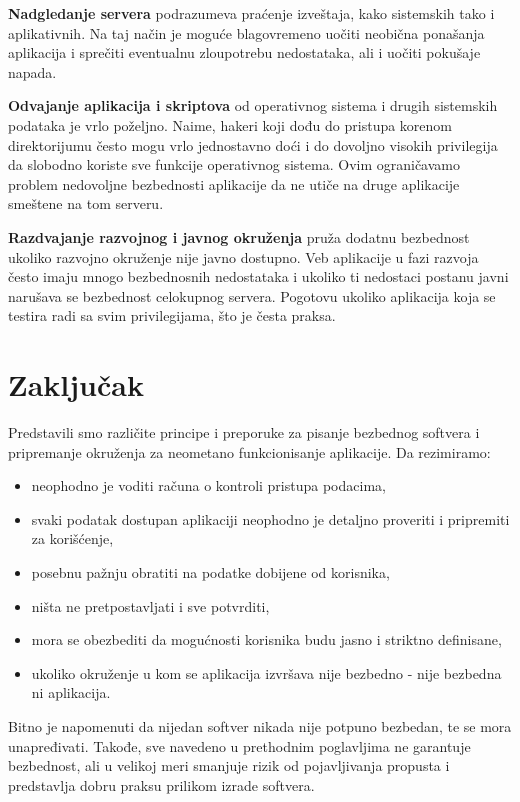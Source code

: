 \documentclass[a4paper]{article}
\begin{document}
\textbf{Nadgledanje servera} podrazumeva praćenje izveštaja, kako sistemskih tako i aplikativnih. Na taj način je moguće blagovremeno uočiti neobična ponašanja aplikacija i sprečiti eventualnu zloupotrebu nedostataka, ali i uočiti pokušaje napada.

\textbf{Odvajanje aplikacija i skriptova} od operativnog sistema i drugih sistemskih podataka je vrlo poželjno. Naime, hakeri koji dođu do pristupa korenom direktorijumu često mogu vrlo jednostavno doći i do dovoljno visokih privilegija da slobodno koriste sve funkcije operativnog sistema. Ovim ograničavamo problem nedovoljne bezbednosti aplikacije da ne utiče na druge aplikacije smeštene na tom serveru.

\textbf{Razdvajanje razvojnog i javnog okruženja} pruža dodatnu bezbednost ukoliko razvojno okruženje nije javno dostupno. Veb aplikacije u fazi razvoja često imaju mnogo bezbednosnih nedostataka i ukoliko ti nedostaci postanu javni narušava se bezbednost celokupnog servera. Pogotovu ukoliko aplikacija koja se testira radi sa svim privilegijama, što je česta praksa.

\section{Zaključak} \label{zakljucak}

Predstavili smo različite principe i preporuke za pisanje bezbednog softvera i pripremanje okruženja za neometano funkcionisanje aplikacije. Da rezimiramo:
\begin{itemize}
	\item neophodno je voditi računa o kontroli pristupa podacima,
	\item svaki podatak dostupan aplikaciji neophodno je detaljno proveriti i pripremiti za korišćenje,
	\item posebnu pažnju obratiti na podatke dobijene od korisnika,
	\item ništa ne pretpostavljati i sve potvrditi,
	\item mora se obezbediti da mogućnosti korisnika budu jasno i striktno definisane,
	\item ukoliko okruženje u kom se aplikacija izvršava nije bezbedno - nije bezbedna ni aplikacija.
\end{itemize}

Bitno je napomenuti da nijedan softver nikada nije potpuno bezbedan, te se mora unapređivati. Takođe, sve navedeno u prethodnim poglavljima ne garantuje bezbednost, ali u velikoj meri smanjuje rizik od pojavljivanja propusta i predstavlja dobru praksu prilikom izrade softvera.
\end{document}
